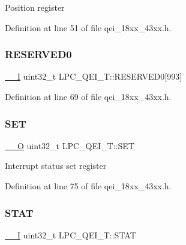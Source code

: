 Position register 

Definition at line 51 of file qei\+\_\+18xx\+\_\+43xx.\+h.

\mbox{\label{struct_l_p_c___q_e_i___t_a4989c1bc50afbce2d2b4e966d2c518a5}} 
\subsubsection{\texorpdfstring{R\+E\+S\+E\+R\+V\+E\+D0}{RESERVED0}}
{\footnotesize\ttfamily \hyperlink{core__sc300_8h_af63697ed9952cc71e1225efe205f6cd3}{\+\_\+\+\_\+I} uint32\+\_\+t L\+P\+C\+\_\+\+Q\+E\+I\+\_\+\+T\+::\+R\+E\+S\+E\+R\+V\+E\+D0\mbox{[}993\mbox{]}}



Definition at line 69 of file qei\+\_\+18xx\+\_\+43xx.\+h.

\mbox{\label{struct_l_p_c___q_e_i___t_a199af3383881188039525c15e18049a9}} 
\subsubsection{\texorpdfstring{S\+ET}{SET}}
{\footnotesize\ttfamily \hyperlink{core__sc300_8h_a7e25d9380f9ef903923964322e71f2f6}{\+\_\+\+\_\+O} uint32\+\_\+t L\+P\+C\+\_\+\+Q\+E\+I\+\_\+\+T\+::\+S\+ET}

Interrupt status set register 

Definition at line 75 of file qei\+\_\+18xx\+\_\+43xx.\+h.

\mbox{\label{struct_l_p_c___q_e_i___t_a842c67512c5c8c9a31e7ba2ec4771784}} 
\subsubsection{\texorpdfstring{S\+T\+AT}{STAT}}
{\footnotesize\ttfamily \hyperlink{core__sc300_8h_af63697ed9952cc71e1225efe205f6cd3}{\+\_\+\+\_\+I} uint32\+\_\+t L\+P\+C\+\_\+\+Q\+E\+I\+\_\+\+T\+::\+S\+T\+AT}

